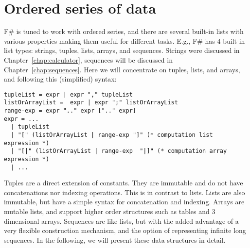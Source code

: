\chapter{Ordered series of data}
\label{chap:lists}
F\# is tuned to work with ordered series, and there are several built-in lists with various properties making them useful for different tasks. E.g.,
%
%
F\# has 4 built-in list types: strings, tuples, lists, arrays, and sequences. Strings were discussed in Chapter~\ref{chap:calculator}, sequences will be discussed in Chapter~\ref{chap:sequences}. Here we will concentrate on tuples, lists,  and arrays, and following this (simplified) syntax:
%
\begin{lstlisting}[language=ebnf]
tupleList = expr | expr "," tupleList
listOrArrayList =  expr | expr ";" listOrArrayList
range-exp = expr ".." expr [".." expr]
expr = ... 
  | tupleList
  | "[" (listOrArrayList | range-exp "]" (* computation list expression *)
  | "[|" (listOrArrayList | range-exp  "|]" (* computation array expression *)
  | ...
\end{lstlisting}
%
 Tuples are a direct extension of constants. They are immutable and do not have concatenations nor indexing operations. This is in contrast to lists. Lists are also immutable, but have a simple syntax for concatenation and indexing. Arrays are mutable lists, and support higher order structures such as tables and 3 dimensional arrays. Sequences are like lists, but with the added advantage of a very flexible construction mechanism, and the option of representing infinite long sequences. In the following, we will present these data structures in detail.

